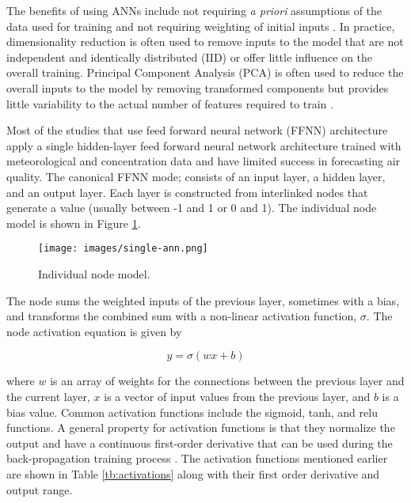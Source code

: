 The benefits of using ANNs include not requiring \textit{a priori} assumptions of the data used for training and not requiring weighting of initial inputs \citep{Gardner1998}. In practice, dimensionality reduction is often used to remove inputs to the model that are not independent and identically distributed (IID) or offer little influence on the overall training. Principal Component Analysis (PCA) is often used to reduce the overall inputs to the model by removing transformed components but provides little variability to the actual number of features required to train \citep{Singh2013, Wang2015a}.

Most of the studies that use feed forward neural network (FFNN) architecture apply a single hidden-layer feed forward neural network architecture trained with meteorological and concentration data and have limited success in forecasting air quality. The canonical FFNN mode; consists of an input layer, a hidden layer, and an output layer. Each layer is constructed from interlinked nodes that generate a value (usually between -1 and 1 or 0 and 1). The individual node model is shown in Figure \ref{fig:SingleANN}. \\
%
\begin{figure}[H]
\centering
\texttt{[image: images/single-ann.png]} 
\caption{Individual node model.}
\label{fig:SingleANN}
\end{figure}
%
The node sums the weighted inputs of the previous layer, sometimes with a bias, and transforms the combined sum with a non-linear activation function, $\sigma$. The node activation equation is given by

\begin{equation}
\label{eq:perceptron}
y= \sigma(wx+b)
\end{equation}

\noindent
where $w$ is an array of weights for the connections between the previous layer and the current layer, $x$ is a vector of input values from the previous layer, and $b$ is a bias value. Common activation functions include the sigmoid, tanh, and relu functions. A general property for activation functions is that they normalize the output and have a continuous first-order derivative that can be used during the back-propagation training process \citep{Goodfellow2016}. The activation functions mentioned earlier are shown in Table \ref{tb:activations} along with their first order derivative and output range.

